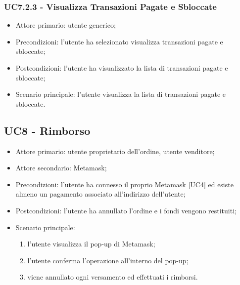 \subsubsection{UC7.2.3 - Visualizza Transazioni Pagate e Sbloccate}

\begin{itemize}
    \item Attore primario: utente generico;
    \item Precondizioni: l'utente ha selezionato visualizza transazioni pagate e sbloccate;
    \item Postcondizioni: l'utente ha visualizzato la lista di transazioni pagate e sbloccate;
    \item Scenario principale: l'utente visualizza la lista di transazioni pagate e sbloccate.
\end{itemize}

\subsection{UC8 - Rimborso}


\begin{itemize}
    \item Attore primario: utente proprietario dell'ordine, utente venditore;
    \item Attore secondario: Metamask;
    \item Precondizioni: l'utente ha connesso il proprio Metamask [UC4] ed esiste almeno un pagamento associato all'indirizzo dell'utente;
    \item Postcondizioni: l'utente ha annullato l'ordine e i fondi vengono restituiti;
    \item Scenario principale:
    \begin{enumerate}
        \item l'utente visualizza il pop-up di Metamask;
        \item l'utente conferma l'operazione all'interno del pop-up;
        \item viene annullato ogni versamento ed effettuati i rimborsi.
    \end{enumerate}
    \end{itemize}


\clearpage
